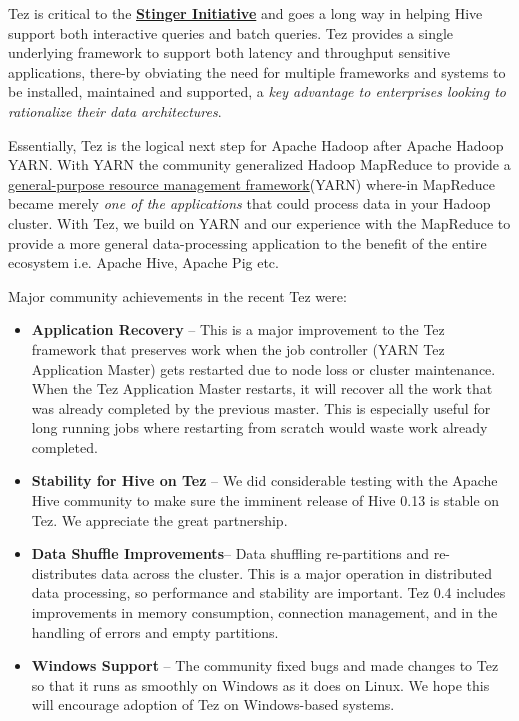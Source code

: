 \documentclass[twocolumn]{article}
\begin{document}
Tez is critical to the
\href{http://hortonworks.com/blog/100x-faster-hive}{\textbf{Stinger
Initiative}} and goes a long way in helping Hive support both
interactive queries and batch queries. Tez provides a single underlying
framework to support both latency and throughput sensitive applications,
there-by obviating the need for multiple frameworks and systems to be
installed, maintained and supported, a \emph{key advantage to
enterprises looking to rationalize their data architectures}.

Essentially, Tez is the logical next step for Apache Hadoop after Apache
Hadoop YARN. With YARN the community generalized Hadoop MapReduce to
provide a
\href{http://hortonworks.com/blog/introducing-apache-hadoop-yarn/}{general-purpose
resource management framework}(YARN) where-in MapReduce became merely
\emph{one of the applications} that could process data in your Hadoop
cluster. With Tez, we build on YARN and our experience with the
MapReduce to provide a more general data-processing application to the
benefit of the entire ecosystem i.e. Apache Hive, Apache Pig etc.

Major community achievements in the recent Tez  were:
\begin{itemize}
\item
  \textbf{Application Recovery} -- This is a major improvement to the
  Tez framework that preserves work when the job controller (YARN Tez
  Application Master) gets restarted due to node loss or cluster
  maintenance. When the Tez Application Master restarts, it will recover
  all the work that was already completed by the previous master. This
  is especially useful for long running jobs where restarting from
  scratch would waste work already completed.
\item
  \textbf{Stability for Hive on Tez} -- We did considerable testing with
  the Apache Hive community to make sure the imminent release of Hive
  0.13 is stable on Tez. We appreciate the great partnership.
\item
  \textbf{Data Shuffle Improvements}-- Data shuffling re-partitions and
  re-distributes data across the cluster. This is a major operation in
  distributed data processing, so performance and stability are
  important. Tez 0.4 includes improvements in memory consumption,
  connection management, and in the handling of errors and empty
  partitions.
\item
  \textbf{Windows Support} -- The community fixed bugs and made changes
  to Tez so that it runs as smoothly on Windows as it does on Linux. We
  hope this will encourage adoption of Tez on Windows-based systems.
\end{itemize}
\end{document}
